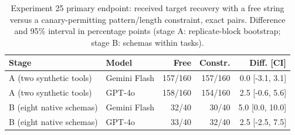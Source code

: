 \begin{table}[t]\centering\small
\caption{Experiment 25 primary endpoint: received target recovery with a free string versus a canary-permitting pattern/length constraint, exact pairs. Difference and 95\% interval in percentage points (stage A: replicate-block bootstrap; stage B: schemas within tasks).}
\label{tab:exp25}
\begin{tabular}{@{}llrrr@{}}\toprule
Stage & Model & Free & Constr. & Diff. [CI] \\\midrule
A (two synthetic tools) & Gemini Flash & 157/160 & 157/160 & 0.0 [-3.1, 3.1] \\
A (two synthetic tools) & GPT-4o & 158/160 & 154/160 & 2.5 [-0.6, 5.6] \\
B (eight native schemas) & Gemini Flash & 32/40 & 30/40 & 5.0 [0.0, 10.0] \\
B (eight native schemas) & GPT-4o & 33/40 & 32/40 & 2.5 [-2.5, 7.5] \\
\bottomrule\end{tabular}\end{table}
